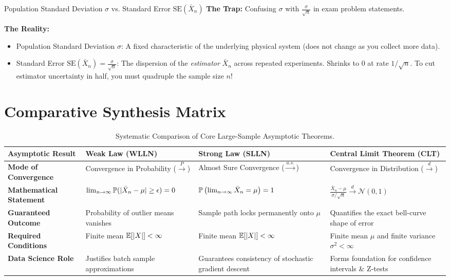 \begin{trapbox}{Population Standard Deviation $\sigma$ vs. Standard Error $\text{SE}(\bar{X}_n)$}
\textbf{The Trap:} Confusing $\sigma$ with $\frac{\sigma}{\sqrt{n}}$ in exam problem statements.

\textbf{The Reality:}
\begin{itemize}
    \item Population Standard Deviation $\sigma$: A fixed characteristic of the underlying physical system (does not change as you collect more data).
    \item Standard Error $\text{SE}(\bar{X}_n) = \frac{\sigma}{\sqrt{n}}$: The dispersion of the \emph{estimator} $\bar{X}_n$ across repeated experiments. Shrinks to 0 at rate $1/\sqrt{n}$. To cut estimator uncertainty in half, you must quadruple the sample size $n$!
\end{itemize}
\end{trapbox}

\section{Comparative Synthesis Matrix}

\begin{table}[htbp]
\centering
\small
\begin{tabular}{p{3.2cm}p{3.8cm}p{3.8cm}p{3.5cm}}
\toprule
\textbf{Asymptotic Result} & \textbf{Weak Law (WLLN)} & \textbf{Strong Law (SLLN)} & \textbf{Central Limit Theorem (CLT)} \\
\midrule
\textbf{Mode of Convergence} & Convergence in Probability ($\xrightarrow{P}$) & Almost Sure Convergence ($\xrightarrow{a.s.}$) & Convergence in Distribution ($\xrightarrow{d}$) \\
\addlinespace
\textbf{Mathematical Statement} & $\lim_{n \to \infty} \P(|\bar{X}_n - \mu| \ge \epsilon) = 0$ & $\P\left(\lim_{n \to \infty} \bar{X}_n = \mu\right) = 1$ & $\frac{\bar{X}_n - \mu}{\sigma/\sqrt{n}} \xrightarrow{d} \mathcal{N}(0, 1)$ \\
\addlinespace
\textbf{Guaranteed Outcome} & Probability of outlier means vanishes & Sample path locks permanently onto $\mu$ & Quantifies the exact bell-curve shape of error \\
\addlinespace
\textbf{Required Conditions} & Finite mean $\E[|X|] < \infty$ & Finite mean $\E[|X|] < \infty$ & Finite mean $\mu$ and finite variance $\sigma^2 < \infty$ \\
\addlinespace
\textbf{Data Science Role} & Justifies batch sample approximations & Guarantees consistency of stochastic gradient descent & Forms foundation for confidence intervals \& Z-tests \\
\bottomrule
\end{tabular}
\caption{Systematic Comparison of Core Large-Sample Asymptotic Theorems.}
\end{table}

